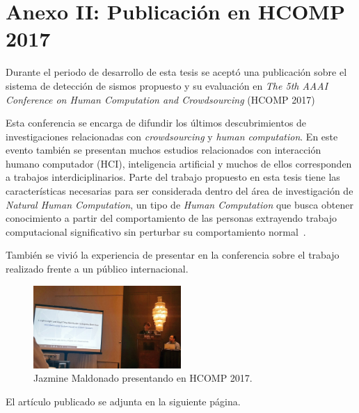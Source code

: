 \chapter*{Anexo II: Publicación en HCOMP 2017}
\label{anexo:paper}

Durante el periodo de desarrollo de esta tesis se aceptó una publicación sobre el sistema de detección de sismos propuesto y su evaluación en \textit{The 5th AAAI Conference on Human Computation and Crowdsourcing} (HCOMP 2017)

Esta conferencia se encarga de difundir los últimos descubrimientos de investigaciones relacionadas con \textit{crowdsourcing} y \textit{human computation}. En este evento también se presentan muchos estudios relacionados con interacción humano computador (HCI), inteligencia artificial y muchos de ellos corresponden a trabajos interdiciplinarios. Parte del trabajo propuesto en esta tesis tiene las características necesarias para ser considerada dentro del área de investigación de \textit{Natural Human Computation}, un tipo de \textit{Human Computation} que busca obtener conocimiento a partir del comportamiento de las personas extrayendo trabajo computacional significativo sin perturbar su comportamiento normal~\cite{EstradaAndLawhead}. 

También se vivió la experiencia de presentar en la conferencia sobre el trabajo realizado frente a un público internacional.

\begin{figure}[!h]
\centering
	\includegraphics[width=0.5\textwidth]{imagenes/hcomp.jpg}
	\caption{Jazmine Maldonado presentando en HCOMP 2017.}
\label{fig:hcomp}
\end{figure} 

El artículo publicado se adjunta en la siguiente página. 

